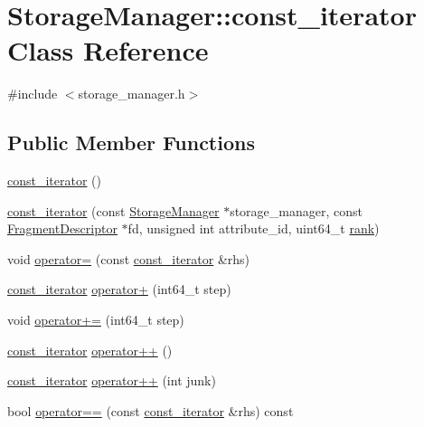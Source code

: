 \hypertarget{classStorageManager_1_1const__iterator}{}\section{Storage\+Manager\+:\+:const\+\_\+iterator Class Reference}
\label{classStorageManager_1_1const__iterator}


{\ttfamily \#include $<$storage\+\_\+manager.\+h$>$}

\subsection*{Public Member Functions}
\begin{DoxyCompactItemize}
\item 
\hyperlink{classStorageManager_1_1const__iterator_aa23b6701ab89b027adf61f10f5f52313}{const\+\_\+iterator} ()
\item 
\hyperlink{classStorageManager_1_1const__iterator_ab6bd2e93e36e219da2d03a0c37e2ef3a}{const\+\_\+iterator} (const \hyperlink{classStorageManager}{Storage\+Manager} $\ast$storage\+\_\+manager, const \hyperlink{classStorageManager_1_1FragmentDescriptor}{Fragment\+Descriptor} $\ast$fd, unsigned int attribute\+\_\+id, uint64\+\_\+t \hyperlink{classStorageManager_1_1const__iterator_a1426e7f28ad3e199db265a7e8a69ca52}{rank})
\item 
void \hyperlink{classStorageManager_1_1const__iterator_a6c22b17170340a23d190364b065852e7}{operator=} (const \hyperlink{classStorageManager_1_1const__iterator}{const\+\_\+iterator} \&rhs)
\item 
\hyperlink{classStorageManager_1_1const__iterator}{const\+\_\+iterator} \hyperlink{classStorageManager_1_1const__iterator_a1ffbfea4d05c48a09a6c84d3982a6a52}{operator+} (int64\+\_\+t step)
\item 
void \hyperlink{classStorageManager_1_1const__iterator_aecb160e5546af0baa0b24d20b679d8ae}{operator+=} (int64\+\_\+t step)
\item 
\hyperlink{classStorageManager_1_1const__iterator}{const\+\_\+iterator} \hyperlink{classStorageManager_1_1const__iterator_a484404eb626c5c9761d13a640a9a4a8f}{operator++} ()
\item 
\hyperlink{classStorageManager_1_1const__iterator}{const\+\_\+iterator} \hyperlink{classStorageManager_1_1const__iterator_afa45174a1058cbe291048518f007b9bd}{operator++} (int junk)
\item 
bool \hyperlink{classStorageManager_1_1const__iterator_a87a967465a826667a2c4cd39ebeea02f}{operator==} (const \hyperlink{classStorageManager_1_1const__iterator}{const\+\_\+iterator} \&rhs) const 

\end{DoxyCompactItemize}
